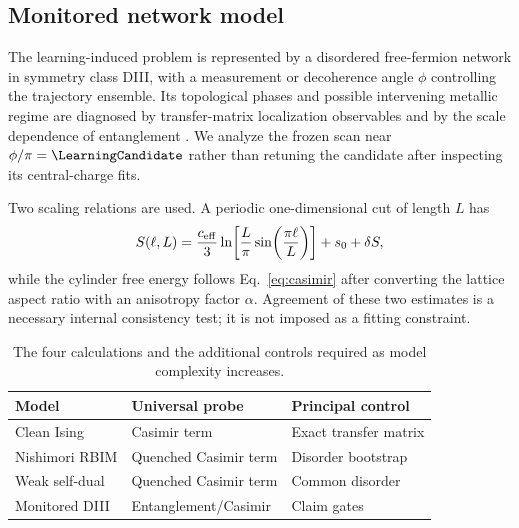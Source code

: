 \documentclass[aps,prb,reprint,superscriptaddress,longbibliography,floatfix]{revtex4-2}
\begin{document}
\subsection{Monitored network model}

The learning-induced problem is represented by a disordered free-fermion
network in symmetry class DIII, with a measurement or decoherence angle
$\phi$ controlling the trajectory ensemble.  Its topological phases and
possible intervening metallic regime are diagnosed by transfer-matrix
localization observables and by the scale dependence of entanglement
\cite{AltlandZirnbauer1997,ChoFisher1997,
WangVasseurTrebstLudwigZhu2025}.  We analyze the frozen scan near
$\phi/\pi=\LearningCandidate$ rather than retuning the candidate after
inspecting its central-charge fits.

Two scaling relations are used.  A periodic one-dimensional cut of length
$L$ has
\begin{equation}
 S(\ell,L)=\frac{c_{\rm eff}}{3}
 \ln\!\left[\frac{L}{\pi}\sin\!\left(\frac{\pi\ell}{L}\right)\right]
 +s_0+\delta S ,
 \label{eq:entanglement}
\end{equation}
while the cylinder free energy follows Eq.~\eqref{eq:casimir} after converting
the lattice aspect ratio with an anisotropy factor $\alpha$.  Agreement of
these two estimates is a necessary internal consistency test; it is not
imposed as a fitting constraint.

\begin{table}[t]
\caption{The four calculations and the additional controls required as model
complexity increases.}
\label{tab:01-models}
\begin{ruledtabular}
\begin{tabular}{lll}
Model & Universal probe & Principal control\\
\hline
Clean Ising & Casimir term & Exact transfer matrix\\
Nishimori RBIM & Quenched Casimir term & Disorder bootstrap\\
Weak self-dual & Quenched Casimir term & Common disorder\\
Monitored DIII & Entanglement/Casimir & Claim gates\\
\end{tabular}
\end{ruledtabular}
\end{table}
\end{document}

